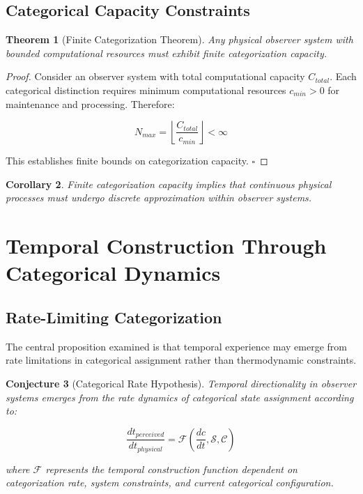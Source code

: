 \documentclass[12pt,a4paper]{article}
\newtheorem{theorem}{Theorem}[section]
\newtheorem{corollary}[theorem]{Corollary}
\newtheorem{conjecture}[theorem]{Conjecture}
\theoremstyle{remark}
\begin{document}
\subsection{Categorical Capacity Constraints}

\begin{theorem}[Finite Categorization Theorem]
Any physical observer system with bounded computational resources must exhibit finite categorization capacity.
\end{theorem}

\begin{proof}
Consider an observer system with total computational capacity $C_{total}$. Each categorical distinction requires minimum computational resources $c_{min} > 0$ for maintenance and processing. Therefore:

\begin{equation}
N_{max} = \left\lfloor \frac{C_{total}}{c_{min}} \right\rfloor < \infty
\end{equation}

This establishes finite bounds on categorization capacity. $\square$
\end{proof}

\begin{corollary}
Finite categorization capacity implies that continuous physical processes must undergo discrete approximation within observer systems.
\end{corollary}

\section{Temporal Construction Through Categorical Dynamics}

\subsection{Rate-Limiting Categorization}

The central proposition examined is that temporal experience may emerge from rate limitations in categorical assignment rather than thermodynamic constraints.

\begin{conjecture}[Categorical Rate Hypothesis]
Temporal directionality in observer systems emerges from the rate dynamics of categorical state assignment according to:

\begin{equation}
\frac{dt_{perceived}}{dt_{physical}} = \mathcal{F}\left(\frac{dc}{dt}, \mathcal{S}, \mathcal{C}\right)
\label{eq:temporal_construction}
\end{equation}

where $\mathcal{F}$ represents the temporal construction function dependent on categorization rate, system constraints, and current categorical configuration.
\end{conjecture}
\end{document}
